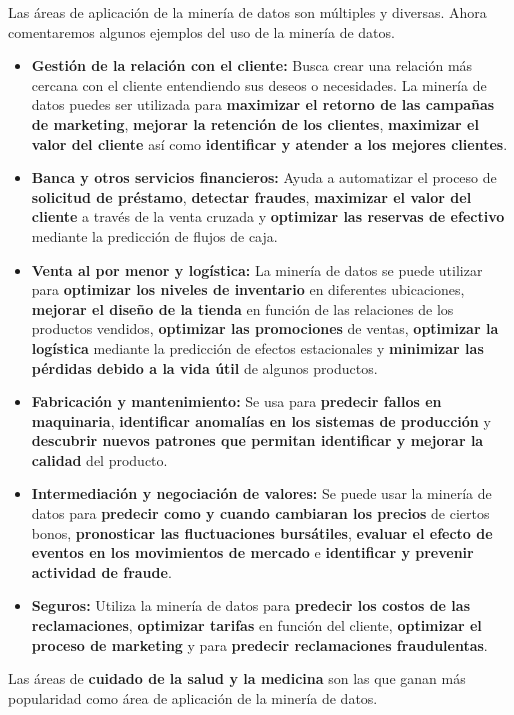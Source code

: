 \documentclass[12pt, twoside, openright]{report} %
\begin{document}
Las áreas de aplicación de la minería de datos son múltiples y diversas. Ahora comentaremos algunos ejemplos del uso de la minería de datos.
\begin{itemize}
	\item \textbf{Gestión de la relación con el cliente:} Busca crear una relación más cercana con el cliente entendiendo sus deseos o necesidades. La minería de datos puedes ser utilizada para \textbf{maximizar el retorno de las campañas de marketing}, \textbf{mejorar la retención de los clientes}, \textbf{maximizar el valor del cliente}  así como \textbf{identificar y atender a los mejores clientes}.
	\item \textbf{Banca y otros servicios financieros:} Ayuda a automatizar el proceso de \textbf{solicitud de préstamo}, \textbf{detectar fraudes}, \textbf{maximizar el valor del cliente} a través de la venta cruzada y \textbf{optimizar las reservas de efectivo} mediante la predicción de flujos de caja.
	\item \textbf{Venta al por menor y logística:} La minería de datos se puede utilizar para \textbf{optimizar los niveles de inventario} en diferentes ubicaciones, \textbf{mejorar el diseño de la tienda} en función de las relaciones de los productos vendidos, \textbf{optimizar las promociones} de ventas, \textbf{optimizar la logística} mediante la predicción de efectos estacionales y \textbf{minimizar las pérdidas debido a la vida útil} de algunos productos.
	\item \textbf{Fabricación y mantenimiento:} Se usa para \textbf{predecir fallos en maquinaria}, \textbf{identificar anomalías en los sistemas de producción} y \textbf{descubrir nuevos patrones que permitan identificar y mejorar la calidad} del producto.
	\item \textbf{Intermediación y negociación de valores:} Se puede usar la minería de datos para \textbf{predecir como y cuando cambiaran los precios} de ciertos bonos, \textbf{pronosticar las fluctuaciones bursátiles}, \textbf{evaluar el efecto de eventos en los movimientos de mercado} e \textbf{identificar y prevenir actividad de fraude}.
	\item \textbf{Seguros:} Utiliza la minería de datos para \textbf{predecir los costos de las reclamaciones}, \textbf{optimizar tarifas} en función del cliente, \textbf{optimizar el proceso de marketing} y para \textbf{predecir reclamaciones fraudulentas}.
\end{itemize}

Las áreas de \textbf{cuidado de la salud y la medicina} son las que ganan más popularidad como área de aplicación de la minería de datos.
\end{document}
